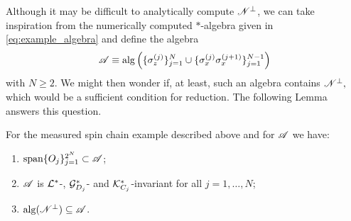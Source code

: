\documentclass[aihp,12pt]{imsart}
\begin{document}
Although it may be difficult to analytically compute $\mathscr{N}^\perp$, we can take inspiration from the numerically computed $*$-algebra given in \eqref{eq:example_algebra} and define the algebra
\[\mathscr{A} \equiv {\rm alg}\left(\{ \sigma_z^{(j)}\}_{j=1}^N\cup\{\sigma_x^{(j)}\sigma_x^{(j+1)}\}_{j=1}^{N-1}\right)\] 
with $N\geq2$. We might then wonder if, at least, such an algebra contains $\mathscr{N}^\perp,$ which would be a sufficient condition for reduction.
The following Lemma answers this question. 
\begin{lemma} 
    For the measured spin chain example described above and for $\mathscr{A}$ we have:
    \begin{enumerate}
        \item ${\rm span}\{O_j\}_{j=1}^{2^N}\subset \mathscr{A}$;
        \item $\mathscr{A}$ is $\mathcal{L}^*$-, $\mathcal{G}_{D_j}^*$- and $\mathcal{K}_{C_j}^*$-invariant for all $j=1,\dots,N$;
        \item ${\rm alg}(\mathscr{N}^\perp)\subseteq\mathscr{A}$.
    \end{enumerate}
\end{lemma}
\end{document}
